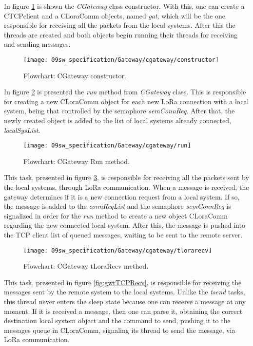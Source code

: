 
In figure \ref{fig:gwtCGatewayconstructor} is shown the \textit{CGateway} class constructor. With this, one can create a CTCPclient and a CLoraComm objects, named \textit{gat}, which will be the one responsible for receiving all the packets from the local systems. After this the threads are created and both objects begin running their threads for receiving and sending messages.

\begin{figure}[H]
	\centering
	\texttt{[image: 09sw\_specification/Gateway/cgateway/constructor]}
	\caption{Flowchart: CGateway constructor.}
	\label{fig:gwtCGatewayconstructor}
\end{figure}

\clearpage
In figure \ref{fig:gwtrun} is presented the \textit{run} method from \textit{CGateway} class. This is responsible for creating a new CLoraComm object for each new LoRa connection with a local system, being that controlled by the semaphore \textit{semConnReq}. After that, the newly created object is added to the list of local systems already connected, \textit{localSysList}.


\begin{figure}[H]
	\centering
	\texttt{[image: 09sw\_specification/Gateway/cgateway/run]}
	\caption{Flowchart: CGateway Run method.}
	\label{fig:gwtrun}
\end{figure}

\clearpage
This task, presented in figure \ref{fig:gwtLoraRecv}, is responsible for receiving all the packets sent by the local systems, through LoRa communication. When a message is received, the gateway determines if it is a new connection request from a local system. If so, the message is added to the \textit{connReqList} and the semaphore \textit{semConnReq} is signalized in order for the \textit{run} method to create a new object CLoraComm regarding the new connected local system. After this, the message is pushed into the TCP client list of queued messages, waiting to be sent to the remote server.

\begin{figure}[H]
	\centering
	\texttt{[image: 09sw\_specification/Gateway/cgateway/tlorarecv]}
	\caption{Flowchart: CGateway tLoraRecv method.}
	\label{fig:gwtLoraRecv}
\end{figure}

\clearpage
This task, presented in figure \ref{fig:gwtTCPRecv}, is responsible for receiving the messages sent by the remote system to the local systems. Unlike the \textit{tsend} tasks, this thread never enters the sleep state because one can receive a message at any moment. If it is received a message, then one can parse it, obtaining the correct destination local system object and the command to send, pushing it to the messages queue in CLoraComm, signaling its thread to send the message, via LoRa communication.

